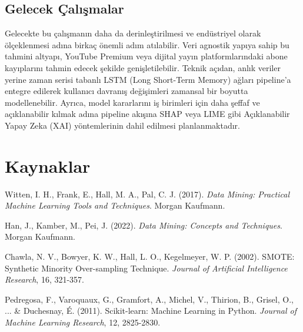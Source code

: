 \documentclass[11pt,a4paper]{article}
\begin{document}
\subsection{Gelecek Çalışmalar}
Gelecekte bu çalışmanın daha da derinleştirilmesi ve endüstriyel olarak ölçeklenmesi adına birkaç önemli adım atılabilir. Veri agnostik yapıya sahip bu tahmini altyapı, YouTube Premium veya dijital yayın platformlarındaki abone kayıplarını tahmin edecek şekilde genişletilebilir. Teknik açıdan, anlık veriler yerine zaman serisi tabanlı LSTM (Long Short-Term Memory) ağları pipeline'a entegre edilerek kullanıcı davranış değişimleri zamansal bir boyutta modellenebilir. Ayrıca, model kararlarını iş birimleri için daha şeffaf ve açıklanabilir kılmak adına pipeline akışına SHAP veya LIME gibi Açıklanabilir Yapay Zeka (XAI) yöntemlerinin dahil edilmesi planlanmaktadır.

	\section*{Kaynaklar}
\begin{enumerate}[label={[\arabic*]}]
    \item Witten, I. H., Frank, E., Hall, M. A., Pal, C. J. (2017). \textit{Data Mining: Practical Machine Learning Tools and Techniques}. Morgan Kaufmann.
    \item Han, J., Kamber, M., Pei, J. (2022). \textit{Data Mining: Concepts and Techniques}. Morgan Kaufmann.
    \item Chawla, N. V., Bowyer, K. W., Hall, L. O., Kegelmeyer, W. P. (2002). SMOTE: Synthetic Minority Over-sampling Technique. \textit{Journal of Artificial Intelligence Research}, 16, 321-357.
    \item Pedregosa, F., Varoquaux, G., Gramfort, A., Michel, V., Thirion, B., Grisel, O., ... \& Duchesnay, É. (2011). Scikit-learn: Machine Learning in Python. \textit{Journal of Machine Learning Research}, 12, 2825-2830.
\end{enumerate}
\end{document}

